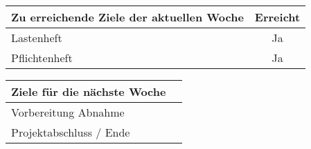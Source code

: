 \begin{tabularx}{\textwidth}{Xc}
    \arrayrulecolor{OliveGreen}
    \toprule
    {\bfseries Zu erreichende Ziele der aktuellen Woche} & {\bfseries Erreicht} \\
    \midrule[2pt]
    Lastenheft                                           &Ja                    \\
    \rowcolor{OliveGreen!15}
    Pflichtenheft                                        &Ja                    \\
    \bottomrule[2pt]
\end{tabularx}
%
\vspace{1cm}
%
\begin{tabularx}{\textwidth}{Xc}
    \arrayrulecolor{OliveGreen}
    \toprule
    {\bfseries Ziele für die nächste Woche}              &                      \\
    \midrule[2pt]
    Vorbereitung Abnahme                                 &                      \\
    \rowcolor{OliveGreen!15}
    Projektabschluss / Ende                              &                      \\
\end{tabularx}
